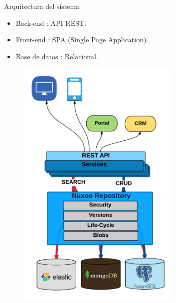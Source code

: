 \documentclass{beamer}
\begin{document}
	\begin{frame}{Arquitectura del sistema}
		\begin{itemize}
			\item {
				Back-end : API REST.
				
			}
			\item {
				Front-end : SPA (Single Page Application).
			}
			\item {
				Base de datos : Relacional.
				
			}
		\end{itemize}
		
		
		\begin{figure}[h]
    		\centering
    		\includegraphics[width=0.7\textwidth, height=0.67\textheight]{images_latex/api}

		\end{figure}
	
	\end{frame}
\end{document}
